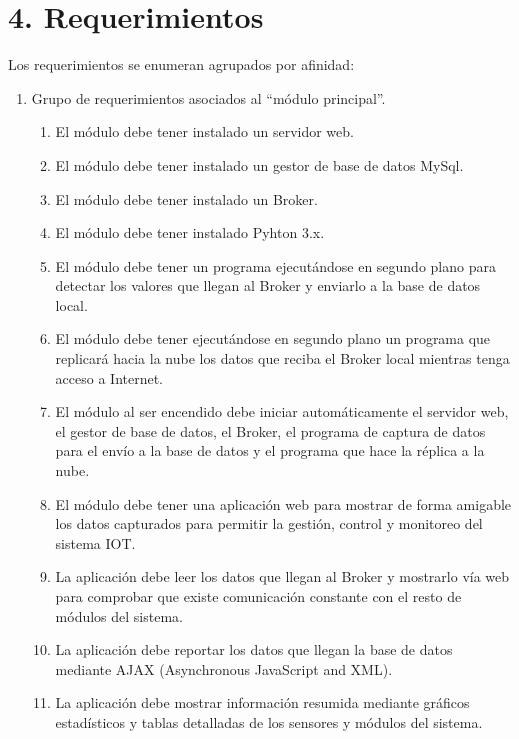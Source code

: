 \documentclass[11pt]{charter}
\begin{document}



\section{4. Requerimientos}
\label{sec:requerimientos}

Los requerimientos se enumeran agrupados por afinidad:

\begin{enumerate}
\item Grupo de requerimientos asociados al ``módulo principal''.
	\begin{enumerate}
	\item El módulo debe tener instalado un servidor web.
	\item El módulo debe tener instalado un gestor de base de datos MySql.
	\item El módulo debe tener instalado un Broker.
	\item El módulo debe tener instalado Pyhton 3.x.
	\item El módulo debe tener un programa ejecutándose en segundo plano para detectar los valores que llegan al Broker y enviarlo a la base de datos local.
	\item El módulo debe tener ejecutándose en segundo plano un programa que replicará hacia la nube los datos que reciba el Broker local mientras tenga acceso a Internet.
	\item El módulo al ser encendido debe iniciar automáticamente el servidor web, el gestor de base de datos, el Broker, el programa de captura de datos para el envío a la base de datos y el programa que hace la réplica a la nube.
	\item El módulo debe tener una aplicación web para mostrar de forma amigable los datos capturados para permitir la gestión, control y monitoreo del sistema IOT.
	\item La aplicación debe leer los datos que llegan al Broker y mostrarlo vía web para comprobar que existe comunicación constante con el resto de módulos del sistema.
	\item La aplicación debe reportar los datos que llegan la base de datos mediante AJAX (Asynchronous JavaScript and XML).
	\item La aplicación debe mostrar información resumida mediante gráficos estadísticos y tablas detalladas de los sensores y módulos del sistema.

\end{enumerate}
\end{enumerate}
\end{document}
